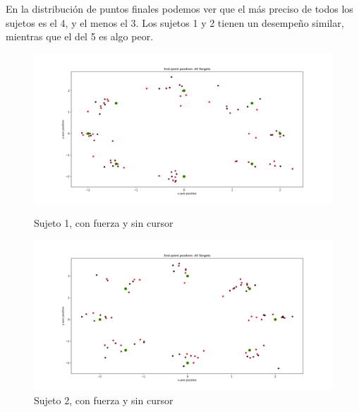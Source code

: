 \documentclass[a4paper,11pt, oneside]{book}
\begin{document}
En la distribución de puntos finales podemos ver que el más preciso de todos los sujetos es el 4, y el menos el 3. Los sujetos 1 y 2 tienen un desempeño similar, mientras que el del 5 es algo peor.

\begin{figure}[H]
	\begin{minipage}[b]{0.5\linewidth}
		\centering
		\includegraphics[width=\linewidth]{sujeto1/force_no_cursor/trayectorias_puntos}
		\caption{Sujeto 1, con fuerza y sin cursor}
		\label{fig:figura1}
	\end{minipage}
	\hspace{0.5cm}
	\begin{minipage}[b]{0.5\linewidth}
		\centering
		\includegraphics[width=\linewidth]{sujeto2/force_no_cursor/trayectorias_puntos}
		\caption{Sujeto 2, con fuerza y sin cursor}
		\label{fig:figura2}
	\end{minipage}
\end{figure}
\end{document}
